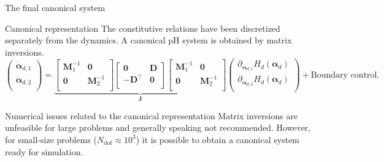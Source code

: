 \documentclass[aspectratio=169]{ISAE-Beamer}
\begin{document}
\begin{frame}{The final canonical system}

\begin{exampleblock}{Canonical representation}
The constitutive relations have been discretized separately from the dynamics. A canonical pH system is obtained by matrix inversions. 
\begin{equation*}
\begin{pmatrix}
\dot{\bm{\alpha}}_{d, 1} \\
\dot{\bm{\alpha}}_{d, 2} \\
\end{pmatrix}
= 
\underbrace{\begin{bmatrix}
	\mathbf{M}_1^{-1} & \mathbf{0} \\
	\mathbf{0} & \mathbf{M}_2^{-1} \\
	\end{bmatrix}
	\begin{bmatrix}
	\mathbf{0} & \mathbf{D} \\
	- \mathbf{D}^\top & \mathbf{0} \\
	\end{bmatrix} 
	\begin{bmatrix}
	\mathbf{M}_1^{-1} & \mathbf{0} \\
	\mathbf{0} & \mathbf{M}_2^{-1} \\
	\end{bmatrix}}_{\mathbf{J}}
\begin{pmatrix}
\partial_{\bm{\alpha}_{d, 1}} H_d(\bm{\alpha}_d)\\
\partial_{\bm{\alpha}_{d, 2}} H_d(\bm{\alpha}_d)\\
\end{pmatrix}  + 
\text{Boundary control}.
\end{equation*}
\end{exampleblock}
	
	
\begin{alertblock}{Numerical issues related to the canonical representation}
 Matrix inversions are unfeasible for large problems and generally speaking not recommended. However, for small-size problems ($N_{\text{dof}} \approx 10^3$) it is possible to obtain a canonical system ready for simulation.
\end{alertblock}

\end{frame}
\end{document}
